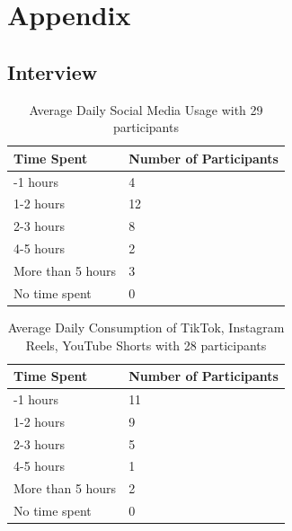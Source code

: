 \documentclass{article}
\begin{document}


% 
% 

\renewcommand{\thesection}{\Alph{section}}

\appendix

\section{Appendix}
\subsection{Interview}

\begin{longtable}[]{@{}ll@{}}
\caption{Average Daily Social Media Usage with 29 participants} \label{average-daily-consumption-of-tiktok-instagram-reels-youtube-shorts} \\
\toprule\noalign{}
Time Spent & Number of Participants \\
\midrule\noalign{}
\endhead
\bottomrule\noalign{}
\endlastfoot
0-1 hours & 4 \\
1-2 hours & 12 \\
2-3 hours & 8 \\
4-5 hours & 2 \\
More than 5 hours & 3 \\
No time spent & 0 \\
\end{longtable}

\begin{longtable}[]{@{}ll@{}}
\caption{Average Daily Consumption of TikTok, Instagram Reels, YouTube Shorts with 28 participants} \label{average-daily-consumption-of-tiktok-instagram-reels-youtube-shorts} \\
\toprule\noalign{}
Time Spent & Number of Participants \\
\midrule\noalign{}
\endhead
\bottomrule\noalign{}
\endlastfoot
0-1 hours & 11 \\
1-2 hours & 9 \\
2-3 hours & 5 \\
4-5 hours & 1 \\
More than 5 hours & 2 \\
No time spent & 0 \\
\end{longtable}
\end{document}
